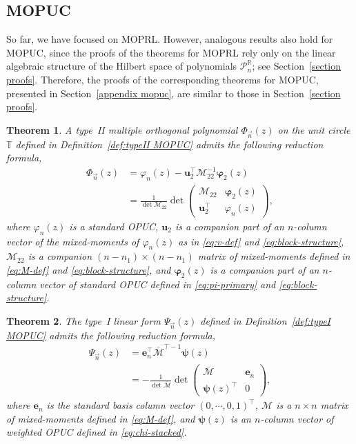\documentclass[a4paper,10pt,leqno]{amsart}
\numberwithin{equation}{section}
\newtheorem{theorem}{Theorem}[section]
\theoremstyle{remark}
\newcommand{\TT}{\mathbb{T}}
\begin{document}
\subsection{MOPUC}

So far, we have focused on MOPRL. However, analogous results also hold for MOPUC, since the proofs of the theorems for MOPRL rely only on the linear algebraic structure of the Hilbert space of polynomials $\mathcal{P}^{\mathbb{R}}_{n}$; see Section~\ref{section proofs}. Therefore, the proofs of the corresponding theorems for MOPUC, presented in Section~\ref{appendix mopuc}, are similar to those in Section~\ref{section proofs}.

\begin{theorem}\label{thm:typeII}
A type~II multiple orthogonal polynomial $\Phi_{\vec{n}}(z)$ on the unit circle $\TT$ defined in Definition~\ref{def:typeII MOPUC} admits the following reduction formula,
\begin{align}\label{eq:typeII-expansion}
\Phi_{\vec{n}}(z) &= \varphi_{n}(z) - \bm{u}_2^\top  \bm{\mathcal M}_{22}^{-1} \bm{\varphi}_2(z)\\
&= \frac{1}{\det \bm{\mathcal M}_{22}} 
\det\begin{pmatrix}
\bm{\mathcal M}_{22} & \bm{\varphi}_2(z)\\
\bm{u}_2^\top & \varphi_{n}(z)
\end{pmatrix},
\end{align}
where $\varphi_n(z)$ is a standard OPUC, $\bm{u}_2$ is a companion part of an $n$-column vector of the mixed-moments of $\varphi_n(z)$ as in \eqref{eq:v-def} and \eqref{eq:block-structure}, $\bm{\mathcal{M}}_{22}$ is a companion $(n-n_1) \times (n-n_1)$ matrix of mixed-moments defined in \eqref{eq:M-def} and \eqref{eq:block-structure}, and $\bm{\varphi}_2(z)$ is a companion part of an $n$-column vector of standard OPUC defined in \eqref{eq:pi-primary} and \eqref{eq:block-structure}.
\end{theorem}

\begin{theorem}\label{thm:typeI}
The type~I linear form $\Psi_{\vec{n}}(z)$ defined in Definition~\ref{def:typeI MOPUC} admits the following reduction formula,
\begin{align}\label{eq:typeI-explicit}
\Psi_{\vec{n}}(z) &= \bm{e}_n^\top \overline{\bm{\mathcal{M}}}^{\top -1} \bm{\psi}(z)\\
&= -\frac{1}{\det \overline{\bm{\mathcal{M}}}}
\det\begin{pmatrix}
\overline{\bm{\mathcal{M}}} & \bm{e}_n\\
\bm{\psi}(z)^\top & 0
\end{pmatrix},
\end{align}
where $\bm{e}_n$ is the standard basis column vector $(0, \cdots, 0, 1)^\top$, $\bm{\mathcal{M}}$ is a $n \times n$ matrix of mixed-moments defined in \eqref{eq:M-def}, and $\bm{\psi}(z)$ is an $n$-column vector of weighted OPUC defined in \eqref{eq:chi-stacked}.
\end{theorem}
\end{document}

